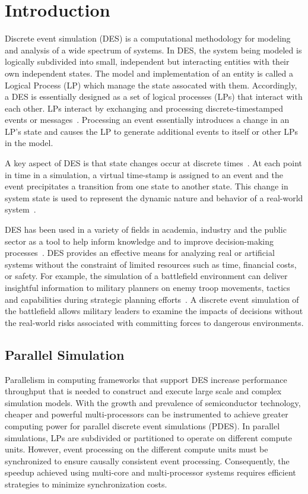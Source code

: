 \chapter{Introduction} 

Discrete event simulation (DES) is a computational methodology for
modeling and analysis of a wide spectrum of systems.  In DES, the
system being modeled is logically subdivided into small, independent
but interacting entities with their own independent states.  The
model and implementation of an entity is called a Logical Process
(LP) which manage the state assocated with them.  Accordingly, a DES
is essentially designed as a set of logical processes (LPs) that
interact with each other.  LPs interact by exchanging and processing
discrete-timestamped events or messages~\cite{jafer-13}.  Processing
an event essentially introduces a change in an LP's state and causes
the LP to generate additional events to itself or other LPs in the
model.

A key aspect of DES is that state changes occur at discrete
times~\cite{fishman-13}.  At each point in time in a simulation, a
virtual time-stamp is assigned to an event and the event precipitates
a transition from one state to another state. This change in system
state is used to represent the dynamic nature and behavior of a
real-world system~\cite{fujimoto-90}.

DES has been used in a variety of fields in academia, industry and the
public sector as a tool to help inform knowledge and to improve
decision-making processes~\cite{fishman-13}. DES provides an effective
means for analyzing real or artificial systems without the constraint
of limited resources such as time, financial costs, or safety. For
example, the simulation of a battlefield environment can deliver
insightful information to military planners on enemy troop movements,
tactics and capabilities during strategic planning
efforts~\cite{hill-01}. A discrete event simulation of the battlefield
allows military leaders to examine the impacts of decisions without
the real-world risks associated with committing forces to dangerous
environments.

\section{Parallel Simulation}

Parallelism in computing frameworks that support DES increase
performance throughput that is needed to construct and execute large
scale and complex simulation models. With the growth and prevalence of
semiconductor technology, cheaper and powerful multi-processors can be
instrumented to achieve greater computing power for parallel discrete
event simulations (PDES).  In parallel simulations, LPs are subdivided
or partitioned to operate on different compute units.  However, event
processing on the different compute units must be synchronized to
ensure causally consistent event processing.  Consequently, the
speedup achieved using multi-core and multi-processor systems requires
efficient strategies to minimize synchronization costs.

